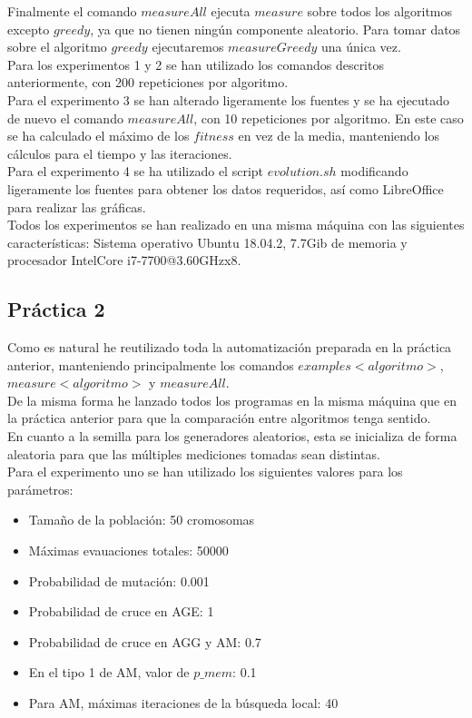 \documentclass[11pt,a4paper]{article}
\begin{document}
	Finalmente el comando $measureAll$ ejecuta $measure$ sobre todos los algoritmos excepto $greedy$, ya que no tienen ningún componente aleatorio. Para tomar datos sobre el algoritmo $greedy$ ejecutaremos $measureGreedy$ una única vez. \\
	
	Para los experimentos 1 y 2 se han utilizado los comandos descritos anteriormente, con 200 repeticiones por algoritmo. \\
	
	Para el experimento 3 se han alterado ligeramente los fuentes y se ha ejecutado de nuevo el comando $measureAll$, con 10 repeticiones por algoritmo. En este caso se ha calculado el máximo de los $fitness$ en vez de la media, manteniendo los cálculos para el tiempo y las iteraciones. \\
	
	Para el experimento 4 se ha utilizado el script $evolution.sh$ modificando ligeramente los fuentes para obtener los datos requeridos, así como LibreOffice para realizar las gráficas. \\
	
	Todos los experimentos se han realizado en una misma máquina con las siguientes características: Sistema operativo Ubuntu 18.04.2, 7.7Gib de memoria y procesador IntelCore i7-7700@3.60GHzx8.
	

	\subsection{ Práctica 2 } \label{procedimiento2}
	
	Como es natural he reutilizado toda la automatización preparada en la práctica anterior, manteniendo principalmente los comandos $examples<algoritmo>$, $measure<algoritmo>$ y $measureAll$. \\
	
	De la misma forma he lanzado todos los programas en la misma máquina que en la práctica anterior para que la comparación entre algoritmos tenga sentido. \\
	
	En cuanto a la semilla para los generadores aleatorios, esta se inicializa de forma aleatoria para que las múltiples mediciones tomadas sean distintas. \\
	
	Para el experimento uno se han utilizado los siguientes valores para los parámetros:
	
	\begin{itemize}
		\item Tamaño de la población: 50 cromosomas
		\item Máximas evauaciones totales: 50000
		\item Probabilidad de mutación: 0.001
		\item Probabilidad de cruce en AGE: 1
		\item Probabilidad de cruce en AGG y AM: 0.7
		\item En el tipo 1 de AM, valor de $p\_mem$: 0.1
		\item Para AM, máximas iteraciones de la búsqueda local: 40
	\end{itemize}
\end{document}
